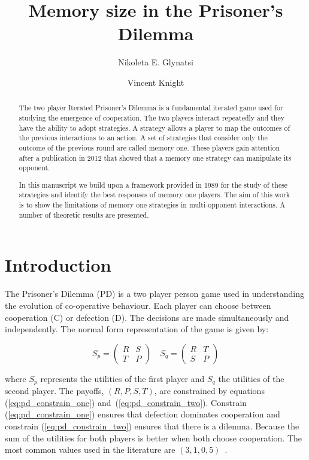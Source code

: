 \documentclass[10pt]{article}
\title{Memory size in the Prisoner's Dilemma}
\author{Nikoleta E. Glynatsi \and Vincent Knight}
\date{}
\begin{document}
\maketitle

\begin{abstract}

The two player Iterated Prisoner's Dilemma is a fundamental iterated game used
for studying the emergence of cooperation. The two players interact repeatedly
and they have the ability to adopt strategies. A strategy allows a player to map
the outcomes of the previous interactions to an action. A set of strategies that
consider only the outcome of the previous round are called memory one. These
players gain attention after a publication in 2012 that showed that a memory one
strategy can manipulate its opponent.

In this manuscript we build upon a framework provided in 1989 for the study of
these strategies and identify the best responses of memory one players. The aim
of this work is to show the limitations of memory one strategies in multi-opponent
interactions. A number of theoretic results are presented.
\end{abstract}

\section{Introduction}\label{section:introduction}

The Prisoner's Dilemma (PD) is a two player person game used in understanding the
evolution of co-operative behaviour. Each player can choose between cooperation
(C) or defection (D). The decisions are made simultaneously and independently.
The normal form representation of the game is given by:

\begin{equation}\label{equ:pd_definition}
    S_p = \begin{pmatrix}
    R & S  \\
    T & P
    \end{pmatrix} \quad
    S_q = \begin{pmatrix}
        R & T  \\
        S & P
        \end{pmatrix}
\end{equation}

where \(S_p\) represents the utilities of the first player and \(S_q\) the utilities
of the second player. The payoffs, \((R, P, S, T)\), are constrained by equations
(\ref{eq:pd_constrain_one}) and~(\ref{eq:pd_constrain_two}). Constrain
(\ref{eq:pd_constrain_one}) ensures that defection dominates cooperation and
constrain (\ref{eq:pd_constrain_two}) ensures that there is a dilemma. Because
the sum of the utilities for both players is better when both choose cooperation.
The most common values used in the literature are \((3, 1, 0, 5)\)~\cite{Axelrod1981}.
\end{document}
